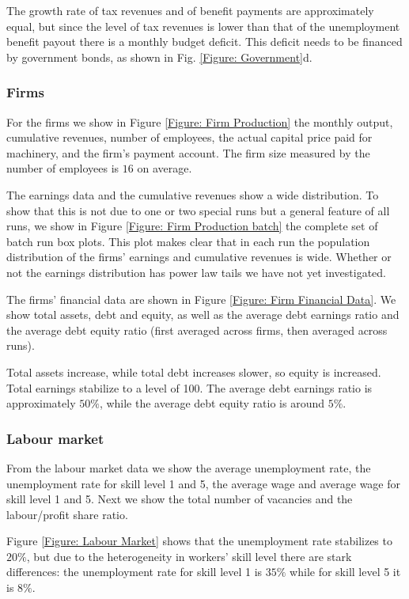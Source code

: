 The growth rate of tax revenues and of benefit payments are approximately equal, but
since the level of tax revenues is lower than that of the unemployment benefit payout there is a monthly budget deficit.
This deficit needs to be financed by government bonds, as shown in Fig. \ref{Figure: Government}d.

\subsubsection*{Firms}
For the firms we show in Figure \ref{Figure: Firm Production} the monthly output, cumulative revenues, number of employees, the actual capital price paid for machinery, and the firm's payment account. The firm size measured by the number of employees is $16$ on average.

The earnings data and the cumulative revenues show a wide distribution. To show that this is not due to one or two special runs but a general feature of all runs, we  show in Figure \ref{Figure: Firm Production batch} the complete set of batch run box plots. This plot makes clear that in each run the population distribution of the firms' earnings and cumulative revenues is wide.
Whether or not the earnings distribution has power law tails we have not yet investigated.

The firms' financial data are shown in Figure \ref{Figure: Firm Financial Data}. We show total assets, debt and equity, as well as
the average debt earnings ratio and the average debt equity ratio (first averaged across firms, then averaged across runs).

Total assets increase, while total debt increases slower, so equity is increased. Total earnings stabilize to a level of 100.
The average debt earnings ratio is approximately $50\%$, while the average debt equity ratio is around $5\%$.

\subsubsection*{Labour market}
From the labour market data we show the average unemployment rate, the unemployment rate for skill level 1 and 5, the average wage and 
average wage for skill level 1 and 5. Next we show the total number of vacancies and the labour/profit share ratio.

Figure \ref{Figure: Labour Market} shows that the unemployment rate stabilizes to $20\%$, but due to the heterogeneity in workers' skill level there are stark differences: the unemployment rate for skill level 1 is $35\%$ while for skill level  5 it is $8\%$.

